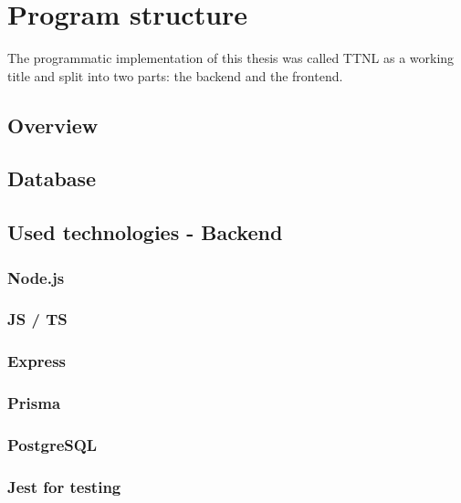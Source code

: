 \section{Program structure}

The programmatic implementation of this thesis was called \ac{TTNL} as a working title and split into two parts: the backend and the frontend.

\subsection{Overview}


\subsection{Database}


\subsection{Used technologies - Backend}


\subsubsection{Node.js}

\subsubsection{\acf{JS} / \acf{TS}}

\subsubsection{Express}

\subsubsection{Prisma}

\subsubsection{PostgreSQL}

\subsubsection{Jest for testing}

